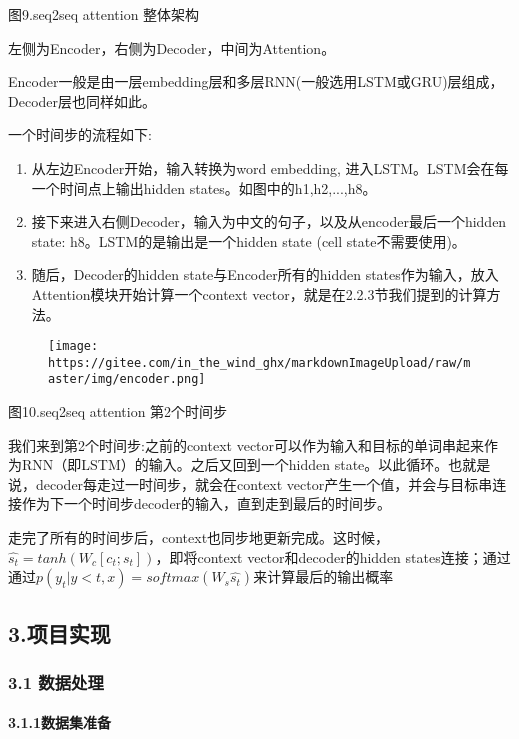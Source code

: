 \documentclass[
]{article}
\begin{document}
图9.seq2seq attention 整体架构

左侧为Encoder，右侧为Decoder，中间为Attention。

Encoder一般是由一层embedding层和多层RNN(一般选用LSTM或GRU)层组成，Decoder层也同样如此。

一个时间步的流程如下:

\begin{enumerate}
\def\labelenumi{\arabic{enumi}.}
\item
  从左边Encoder开始，输入转换为word embedding,
  进入LSTM。LSTM会在每一个时间点上输出hidden
  states。如图中的h1,h2,...,h8。
\item
  接下来进入右侧Decoder，输入为中文的句子，以及从encoder最后一个hidden
  state: h8。LSTM的是输出是一个hidden state (cell state不需要使用)。
\item
  随后，Decoder的hidden state与Encoder所有的hidden
  states作为输入，放入Attention模块开始计算一个context
  vector，就是在2.2.3节我们提到的计算方法。
\end{enumerate}

\begin{figure}
\centering
\texttt{[image: https://gitee.com/in\_the\_wind\_ghx/markdownImageUpload/raw/master/img/encoder.png]}
\caption{}
\end{figure}

图10.seq2seq attention 第2个时间步

我们来到第2个时间步:之前的context
vector可以作为输入和目标的单词串起来作为RNN（即LSTM）的输入。之后又回到一个hidden
state。以此循环。也就是说，decoder每走过一时间步，就会在context
vector产生一个值，并会与目标串连接作为下一个时间步decoder的输入，直到走到最后的时间步。

走完了所有的时间步后，context也同步地更新完成。这时候，\(\hat{s_t}=tanh(W_c[c_t;s_t])\)，即将context
vector和decoder的hidden
states连接；通过通过\(p(y_t|y<t,x)=softmax(W_s\hat{s_t})\)来计算最后的输出概率

\hypertarget{header-n83}{%
\subsection{3.项目实现}\label{header-n83}}

\hypertarget{header-n84}{%
\subsubsection{3.1 数据处理}\label{header-n84}}

\hypertarget{header-n85}{%
\paragraph{3.1.1数据集准备}\label{header-n85}}
\end{document}
